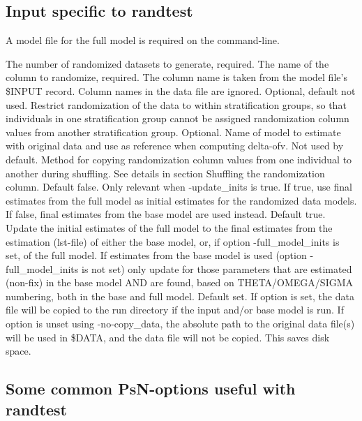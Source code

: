 \subsection{Input specific to randtest}
A model file for the full model is required on the command-line.
\begin{optionlist}
The number of randomized datasets to generate, required. 
\nextopt
{}
The name of the column to randomize, required. The column name is taken from the model file's \$INPUT record. Column names in the data file are ignored. 
\nextopt
{}
Optional, default not used. Restrict randomization of the data to within stratification groups, so that individuals in one stratification group cannot be assigned randomization column values from another stratification group. 
\nextopt
{}
Optional. Name of model to estimate with original data and use as reference when computing delta-ofv. 
\nextopt
{}
Not used by default. Method for copying randomization column values from one individual to another during shuffling. See details in section Shuffling the randomization column.     
\nextopt
{}
Default false. Only relevant when -update\_inits is true. If true, use final estimates from
the full model as initial estimates for the randomized data models. If false,
final estimates from the base model are used instead.
\nextopt
{}
Default true. Update the initial estimates of the 
full model to the final estimates from the estimation (lst-file) of either the base model,
or, if option -full\_model\_inits is set, of the full model.
If estimates from the base model is used (option -full\_model\_inits is not set)
only update for those parameters that are estimated (non-fix) in the base model AND are found,
based on THETA/OMEGA/SIGMA numbering, both in the base and full model.
\nextopt
{}
Default set. If option is set, the data file
will be copied to the run directory if the input and/or base model is run.
If option is unset using -no-copy\_data, the absolute path to the original data file(s) will be used in
\$DATA, and the data file will not be copied. This saves disk space.
\nextopt
\end{optionlist}

\subsection{Some common PsN-options useful with randtest}

